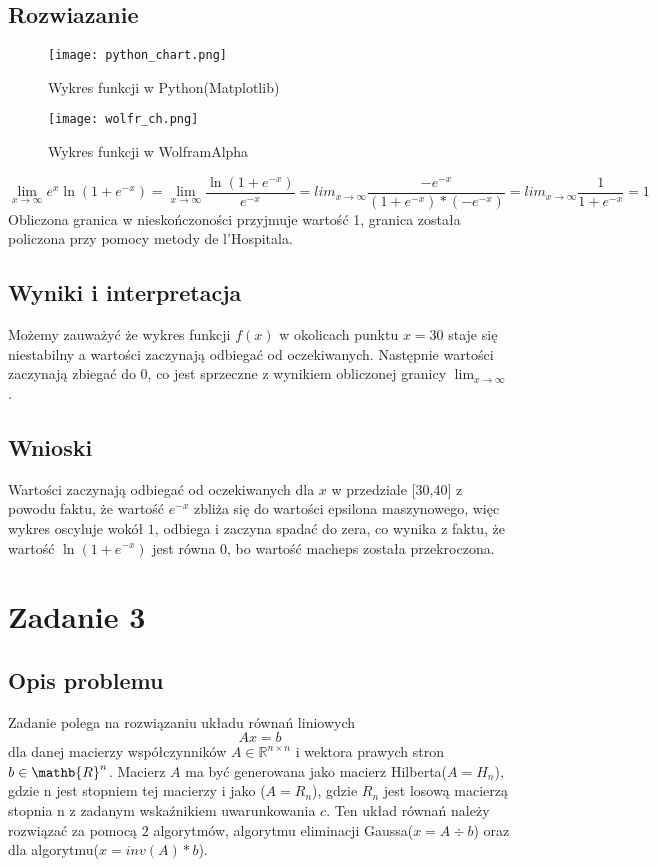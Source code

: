 \documentclass{article}
\begin{document}
\subsection{Rozwiazanie}

\begin{figure}[H] 
\texttt{[image: python\_chart.png]}
\caption{Wykres funkcji w Python(Matplotlib)}
\label{fig:figure_xx}
\end{figure}

\begin{figure}[H] 
\centering
\texttt{[image: wolfr\_ch.png]}
\caption{Wykres funkcji w WolframAlpha}
\label{fig:figure_xxyy}
\end{figure}
\vspace{10pt}

$$\lim_{x \to \infty}e^{x}\ln{(1 + e^{-x})} = \lim_{x \to \infty}\frac{\ln{(1+e^{-x})}}{e^{-x}} = lim_{x \to \infty}\frac{-e^{-x}}{(1+e^{-x})*(-e^{-x})} = lim_{x \to \infty}\frac{1}{1 + e^{-x}} = 1 $$ 
Obliczona granica w nieskończoności przyjmuje wartość 1, granica została policzona przy pomocy metody de l’Hospitala.

\subsection{Wyniki i interpretacja}
Możemy zauważyć że wykres funkcji $f(x)$ w okolicach punktu $x=30$ staje się niestabilny a wartości zaczynają odbiegać od oczekiwanych. Następnie wartości zaczynają zbiegać do $0$, co jest sprzeczne z wynikiem obliczonej granicy $\lim_{x \to \infty}$.
\subsection{Wnioski}
Wartości zaczynają odbiegać od oczekiwanych dla $x$ w przedziale [30,40] z powodu faktu, że wartość $e^{-x}$ zbliża się do wartości epsilona maszynowego, więc wykres oscyluje wokół $1$, odbiega i zaczyna spadać do zera, co wynika z faktu, że wartość $\ln{(1 + e^{-x})}$ jest równa 0, bo wartość macheps została przekroczona.
\section{Zadanie 3}
\subsection{Opis problemu}
Zadanie polega na rozwiązaniu układu równań liniowych $$Ax=b$$ dla danej macierzy 
współczynników $A \in \mathbb{R}^{n \times n}$ i wektora prawych stron $b \in \mathb{R}^{n}$. Macierz $A$ ma być generowana jako macierz Hilberta($A=H_n$), gdzie n jest stopniem tej macierzy i jako ($A=R_n$), gdzie $R_n$ jest losową macierzą stopnia n z zadanym wskaźnikiem uwarunkowania $c$. Ten układ równań należy rozwiązać za pomocą $2$ algorytmów, algorytmu eliminacji Gaussa($x=A\div{b}$) oraz dla algorytmu($x=inv(A)*b$).
\end{document}
